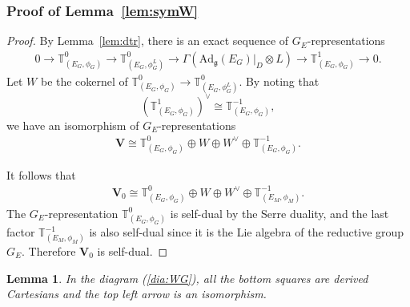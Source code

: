 \documentclass [11pt,oneside,a4paper,mathscr]{amsart}
\newtheorem{lemma}[thm]{Lemma}
\theoremstyle{definition}
\newcommand{\fg}{\mathfrak{g}}
\newcommand{\Ad}{\mathrm{Ad}}
\begin{document}
\subsubsection{Proof of Lemma~\ref{lem:symW}}\label{subsub:1}
\begin{proof}
By Lemma~\ref{lem:dtr}, there is an exact sequence of $G_E$-representations 
\begin{align}\label{exact:ad}
    0 \to \mathbb{T}^0_{(E_G, \phi_G)} \to \mathbb{T}^0_{(E_G, \phi_G^{L})} \to \Gamma(\Ad_{\fg}(E_G)|_{D}\otimes L)
    \to \mathbb{T}^1_{(E_G, \phi_G)} \to 0. 
\end{align}
Let $W$ be the cokernel of $\mathbb{T}^0_{(E_G, \phi_G)} \to \mathbb{T}^0_{(E_G, \phi_G^{L})}$. 
By noting that \[(\mathbb{T}^{1}_{(E_G, \phi_G)})^{\vee}\cong \mathbb{T}^{-1}_{(E_G, \phi_G)},\]
we have an isomorphism of $G_E$-representations
\begin{align}\label{rep:V}
    \mathbf{V}\cong \mathbb{T}^0_{(E_G, \phi_G)} \oplus W \oplus W^{\vee} \oplus \mathbb{T}^{-1}_{(E_G, \phi_G)}. 
\end{align}

It follows that 
\begin{align}\label{rep:V2}
      \mathbf{V}_0 \cong \mathbb{T}^0_{(E_G, \phi_G)} \oplus W \oplus W^{\vee} \oplus
      \mathbb{T}^{-1}_{(E_M, \phi_M)}.   
\end{align}
The $G_E$-representation $\mathbb{T}^0_{(E_G, \phi_G)}$ is self-dual by the Serre duality, 
and the last factor $\mathbb{T}^{-1}_{(E_M, \phi_M)}$ is also self-dual since it is the Lie algebra 
of the reductive group $G_E$. Therefore $\mathbf{V}_0$ is self-dual. 
\end{proof}
\begin{lemma}\label{lem:cart0}
In the diagram (\ref{dia:WG}), all the bottom squares are derived 
Cartesians and the top left arrow is an isomorphism. 
\end{lemma}
\end{document}
